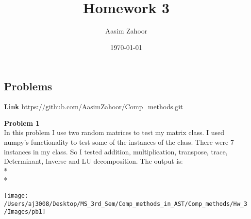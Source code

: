 \documentclass{article}
\title{Homework 3}
\author{Aasim Zahoor}
\date\today
\begin{document}
\maketitle 


\begin{center}
\section{Problems}
\end{center}
\textbf{Link}\vspace{1.5em}
\url{https://github.com/AasimZahoor/Comp_methods.git}
\vspace{1.5em}

\textbf{Problem 1}\vspace{1.5em}
\\
In this problem I use two random matrices to test my matrix class. I used numpy's functionality to test some of the instances of the class. There were 7 instances in my class. So I tested addition, multiplication, transpose, trace, Determinant, Inverse and LU decomposition. The output is:
\\*
\\*
\begin{center}
\texttt{[image: /Users/aj3008/Desktop/MS\_3rd\_Sem/Comp\_methods\_in\_AST/Comp\_methods/Hw\_3/Images/pb1]}
\end{center}

\clearpage
\end{document}
